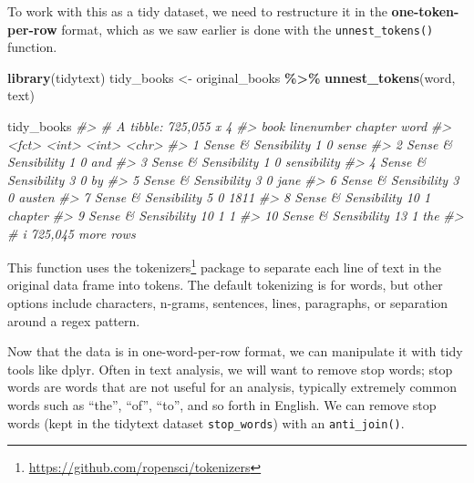 \documentclass[
]{book}
\newenvironment{Shaded}{\begin{snugshade}}{\end{snugshade}}
\newcommand{\CommentTok}[1]{\textcolor[rgb]{0.56,0.35,0.01}{\textit{#1}}}
\newcommand{\FunctionTok}[1]{\textcolor[rgb]{0.13,0.29,0.53}{\textbf{#1}}}
\newcommand{\NormalTok}[1]{#1}
\newcommand{\OtherTok}[1]{\textcolor[rgb]{0.56,0.35,0.01}{#1}}
\newcommand{\SpecialCharTok}[1]{\textcolor[rgb]{0.81,0.36,0.00}{\textbf{#1}}}
\DeclareRobustCommand{\href}[2]{#2\footnote{\url{#1}}}
\begin{document}
To work with this as a tidy dataset, we need to restructure it in the \textbf{one-token-per-row} format, which as we saw earlier is done with the \texttt{unnest\_tokens()} function.

\begin{Shaded}
\begin{Highlighting}[]
\FunctionTok{library}\NormalTok{(tidytext)}
\NormalTok{tidy\_books }\OtherTok{\textless{}{-}}\NormalTok{ original\_books }\SpecialCharTok{\%\textgreater{}\%}
  \FunctionTok{unnest\_tokens}\NormalTok{(word, text)}

\NormalTok{tidy\_books}
\CommentTok{\#\textgreater{} \# A tibble: 725,055 x 4}
\CommentTok{\#\textgreater{}    book                linenumber chapter word       }
\CommentTok{\#\textgreater{}    \textless{}fct\textgreater{}                    \textless{}int\textgreater{}   \textless{}int\textgreater{} \textless{}chr\textgreater{}      }
\CommentTok{\#\textgreater{}  1 Sense \& Sensibility          1       0 sense      }
\CommentTok{\#\textgreater{}  2 Sense \& Sensibility          1       0 and        }
\CommentTok{\#\textgreater{}  3 Sense \& Sensibility          1       0 sensibility}
\CommentTok{\#\textgreater{}  4 Sense \& Sensibility          3       0 by         }
\CommentTok{\#\textgreater{}  5 Sense \& Sensibility          3       0 jane       }
\CommentTok{\#\textgreater{}  6 Sense \& Sensibility          3       0 austen     }
\CommentTok{\#\textgreater{}  7 Sense \& Sensibility          5       0 1811       }
\CommentTok{\#\textgreater{}  8 Sense \& Sensibility         10       1 chapter    }
\CommentTok{\#\textgreater{}  9 Sense \& Sensibility         10       1 1          }
\CommentTok{\#\textgreater{} 10 Sense \& Sensibility         13       1 the        }
\CommentTok{\#\textgreater{} \# i 725,045 more rows}
\end{Highlighting}
\end{Shaded}

This function uses the \href{https://github.com/ropensci/tokenizers}{tokenizers} package to separate each line of text in the original data frame into tokens. The default tokenizing is for words, but other options include characters, n-grams, sentences, lines, paragraphs, or separation around a regex pattern.

Now that the data is in one-word-per-row format, we can manipulate it with tidy tools like dplyr. Often in text analysis, we will want to remove stop words; stop words are words that are not useful for an analysis, typically extremely common words such as ``the'', ``of'', ``to'', and so forth in English. We can remove stop words (kept in the tidytext dataset \texttt{stop\_words}) with an \texttt{anti\_join()}.
\end{document}
